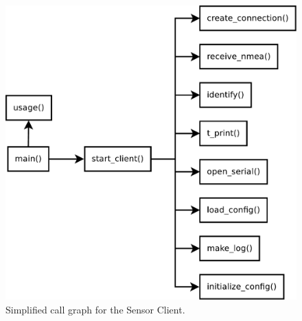\documentclass[12pt,english,a4paper]{report}
\begin{document}
\begin{figure}\label{client_call_graph}
\centering
  \includegraphics[scale=0.3]{client_call_graph.pdf}
   \caption[Sensor Client simplified call graph]{Simplified call graph for the Sensor Client.}
\end{figure}
\end{document}
